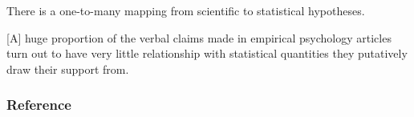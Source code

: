 \documentclass[aspectratio=169]{beamer}
\begin{document}
\begin{frame}
    \hspace*{\fill}
    \raisebox{74.5pt}{
        \begin{minipage}[t]{1em}
            \fontsize{56}{66}\selectfont
            \bfseries
            ,,
        \end{minipage}
    }
    \begin{minipage}{24em}
        There is a one-to-many mapping from scientific to statistical
        hypotheses.

        \begin{flushright}
            \bigskip
            \scriptsize
            \citep[str. 6]{gelmanGardenForkingPaths2013}
        \end{flushright}

        \bigskip

        [A] huge proportion of the verbal claims made in empirical psychology
        articles turn out to have very little relationship with statistical
        quantities they putatively draw their support from.

        \begin{flushright}
            \bigskip
            \scriptsize
            \raggedleft
            \citep[str. 2]{yarkoniGeneralizabilityCrisis2019}
        \end{flushright}
    \end{minipage}
    \hspace*{\fill}
\end{frame}


\begin{frame}[allowframebreaks]
    \frametitle{Reference}

    
    
\end{frame}
\end{document}

